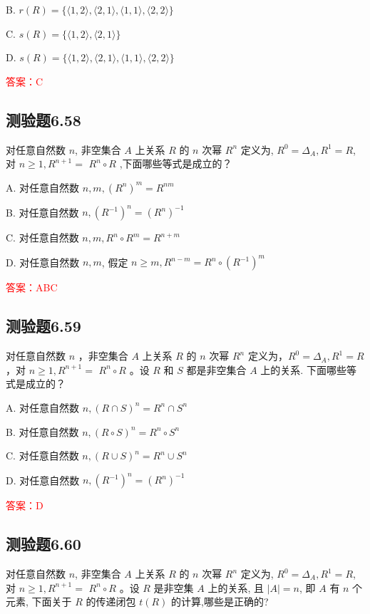 \documentclass[UTF8, heading=true]{ctexart}
\begin{document}
B. 
$
r(R)=\{\langle 1,2\rangle,\langle 2,1\rangle,\langle 1,1\rangle,\langle 2,2\rangle\}
$

C. 
$
s(R)=\{\langle 1,2\rangle,\langle 2,1\rangle\}
$

D. 
$
s(R)=\{\langle 1,2\rangle,\langle 2,1\rangle,\langle 1,1\rangle,\langle 2,2\rangle\}
$

\textcolor{red}{答案：C}

\subsection{测验题6.58}

对任意自然数 $n$, 非空集合 $A$ 上关系 $R$ 的 $n$ 次幂 $R^n$ 定义为, $R^0=\Delta_A, R^1=R$, 对 $n \geq 1, R^{n+1}=$
$R^n \circ R$ ,下面哪些等式是成立的？

A. 对任意自然数 $n, m,\left(R^n\right)^m=R^{n m}$

B. 对任意自然数 $n,\left(R^{-1}\right)^n=\left(R^n\right)^{-1}$

C. 对任意自然数 $n, m, R^n \circ R^m=R^{n+m}$

D. 对任意自然数 $n, m$, 假定 $n \geq m, R^{n-m}=R^n \circ\left(R^{-1}\right)^m$

\textcolor{red}{答案：ABC}

\subsection{测验题6.59}

对任意自然数 $n$ ，非空集合 $A$ 上关系 $R$ 的 $n$ 次幂 $R^n$ 定义为，$R^0=\Delta_A, R^1=R$ ，对 $n \geq 1, R^{n+1}=$
$R^n \circ R$ 。设 $R$ 和 $S$ 都是非空集合 $A$ 上的关系. 下面哪些等式是成立的？

A. 对任意自然数 $n,(R \cap S)^n=R^n \cap S^n$

B. 对任意自然数 $n,(R \circ S)^n=R^n \circ S^n$


C. 对任意自然数 $n,(R \cup S)^n=R^n \cup S^n$

D. 对任意自然数 $n,\left(R^{-1}\right)^n=\left(R^n\right)^{-1}$

\textcolor{red}{答案：D}

\subsection{测验题6.60}

对任意自然数 $n$, 非空集合 $A$ 上关系 $R$ 的 $n$ 次幂 $R^n$ 定义为, $R^0=\Delta_A, R^1=R$, 对 $n \geq 1, R^{n+1}=$ $R^n \circ R$ 。设 $R$ 是非空集 $A$ 上的关系, 且 $|A|=n$, 即 $A$ 有 $n$ 个元素, 下面关于 $R$ 的传递闭包 $t(R)$ 的计算,哪些是正确的?
\end{document}
